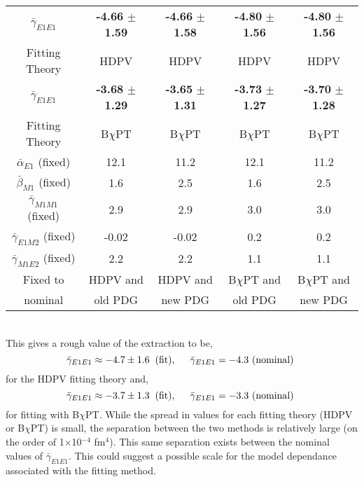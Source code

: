 \documentclass[]{article}
\begin{document}
\begin{table}[h!]
	\centering %
	\begin{tabular}{|c|c|c|c|c|} %
		\hline %
		$\bar{\gamma}_{E1E1}$ & \textbf{-4.66} $\pm$ \textbf{1.59}  & \textbf{-4.66} $\pm$ \textbf{1.58} & \textbf{-4.80} $\pm$ \textbf{1.56} & \textbf{-4.80} $\pm$ \textbf{1.56}\\ [0.5ex]
		Fitting Theory & HDPV &  HDPV & HDPV & HDPV \\[0.5ex]		
		\hline
		\hline %
		$\bar{\gamma}_{E1E1}$ & \textbf{-3.68} $\pm$ \textbf{1.29}  & \textbf{-3.65} $\pm$ \textbf{1.31} & \textbf{-3.73} $\pm$ \textbf{1.27} & \textbf{-3.70} $\pm$ \textbf{1.28}\\ [0.5ex]
		Fitting Theory & B$\chi$PT &  B$\chi$PT & B$\chi$PT & B$\chi$PT\\[0.5ex]
		\hline
		\hline		
		$\bar{\alpha}_{E1}$   (fixed) & 12.1 & 11.2 & 12.1 & 11.2 \\
		$\bar{\beta}_{M1}$   (fixed) & 1.6 & 2.5 & 1.6 & 2.5\\
		\hline
		$\bar{\gamma}_{M1M1}$ (fixed) & 2.9   & 2.9  & 3.0  & 3.0 \\
		$\bar{\gamma}_{E1M2}$ (fixed) & -0.02 & -0.02 & 0.2 & 0.2  \\
		$\bar{\gamma}_{M1E2}$ (fixed) & 2.2 & 2.2 & 1.1 & 1.1 \\	[0.5ex]
		\hline
		Fixed to & HDPV and & HDPV and & B$\chi$PT and & B$\chi$PT and \\
		nominal  & old PDG & new PDG & old PDG & new PDG \\
		\hline
	\end{tabular}
\end{table}

\noindent \\ This gives a rough value of the extraction to be,
\begin{equation}
\bar{\gamma}_{E1E1} \approx -4.7 \pm 1.6 \hspace{2mm} \text{(fit)}, \hspace{5mm} \bar{\gamma}_{E1E1} = -4.3 \text{ (nominal) }
\end{equation}
for the HDPV fitting theory and,
\begin{equation}
\bar{\gamma}_{E1E1} \approx -3.7 \pm 1.3 \hspace{2mm} \text{(fit)}, \hspace{5mm} \bar{\gamma}_{E1E1} = -3.3 \text{ (nominal) }
\end{equation}
for fitting with B$\chi$PT. While the spread in values for each fitting theory (HDPV or B$\chi$PT) is small, the separation between the two methods is relatively large (on the order of 1$\times$10$^{-4}$ fm$^{4}$). This same separation exists between the nominal values of $\bar{\gamma}_{E1E1}$. This could suggest a possible scale for the model dependance associated with the fitting method. 
\end{document}
